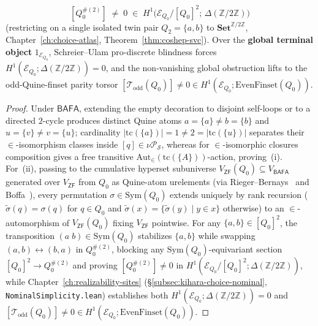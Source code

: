 \begin{proposition}
\begin{enumerate}[label=\textup{(\roman*)},leftmargin=1.8em]
  \[
    [Q_0^{\#(2)}] \;\neq\; 0 \;\in\; H^1\bigl(\mathcal{E}_{Q_0}/[Q_0]^2;\, \Delta(\mathbb{Z}/2\mathbb{Z})\bigr)
  \]
  (restricting on a single isolated twin pair $Q_2 = \{a, b\}$ to $\mathbf{Set}^{\mathbb{Z}/2\mathbb{Z}}$, Chapter~\ref{ch:choice-atlas}, Theorem~\ref{thm:coshep-svc}). Over the \textbf{global terminal object} $1_{\mathcal{E}_{Q_0}}$, Schreier--Ulam pro-discrete blindness forces $H^1(\mathcal{E}_{Q_0}; \Delta(\mathbb{Z}/2\mathbb{Z})) = 0$, and the non-vanishing global obstruction lifts to the odd-Quine-finset parity torsor $[\mathcal{T}_{\mathrm{odd}}(Q_0)] \neq 0 \in H^1(\mathcal{E}_{Q_0}; \mathrm{EvenFinset}(Q_0))$.
\end{enumerate}
\end{proposition}

\begin{proof}
Under $\mathsf{BAFA}$, extending the empty decoration to disjoint self-loops or to a directed $2$-cycle produces distinct Quine atoms $a = \{a\} \neq b = \{b\}$ and $u = \{v\} \neq v = \{u\}$; cardinality $|\mathrm{tc}(\{a\})| = 1 \neq 2 = |\mathrm{tc}(\{u\})|$ separates their $\in$-isomorphism classes inside $[q] \in \nu \mathcal{P}_{\mathcal{S}}$, whereas for $\in$-isomorphic closures composition gives a free transitive $\mathrm{Aut}_\in(\mathrm{tc}(\{A\}))$-action, proving~(i). For~(ii), passing to the cumulative hyperset subuniverse $V_{\mathsf{ZF}}(Q_0) \subseteq V_{\mathsf{BAFA}}$ generated over $V_{\mathsf{ZF}}$ from $Q_0$ as Quine-atom urelements (via Rieger--Bernays~\cite{Bernays54,Rieger57} and Boffa~\cite{Boffa69}), every permutation $\sigma \in \mathrm{Sym}(Q_0)$ extends uniquely by rank recursion ($\tilde{\sigma}(q) = \sigma(q)$ for $q \in Q_0$ and $\tilde{\sigma}(x) = \{\tilde{\sigma}(y) \mid y \in x\}$ otherwise) to an $\in$-automorphism of $V_{\mathsf{ZF}}(Q_0)$ fixing $V_{\mathsf{ZF}}$ pointwise. For any $\{a, b\} \in [Q_0]^2$, the transposition $(a\;b) \in \mathrm{Sym}(Q_0)$ stabilizes $\{a, b\}$ while swapping $(a, b) \leftrightarrow (b, a)$ in $Q_0^{\#(2)}$, blocking any $\mathrm{Sym}(Q_0)$-equivariant section $[Q_0]^2 \to Q_0^{\#(2)}$ and proving $[Q_0^{\#(2)}] \neq 0$ in $H^1(\mathcal{E}_{Q_0}/[Q_0]^2; \Delta(\mathbb{Z}/2\mathbb{Z}))$, while Chapter~\ref{ch:realizability-sites} (\S\ref{subsec:kihara-choice-nominal}, \texttt{NominalSimplicity.lean}) establishes both $H^1(\mathcal{E}_{Q_0}; \Delta(\mathbb{Z}/2\mathbb{Z})) = 0$ and $[\mathcal{T}_{\mathrm{odd}}(Q_0)] \neq 0 \in H^1(\mathcal{E}_{Q_0}; \mathrm{EvenFinset}(Q_0))$.
\end{proof}

